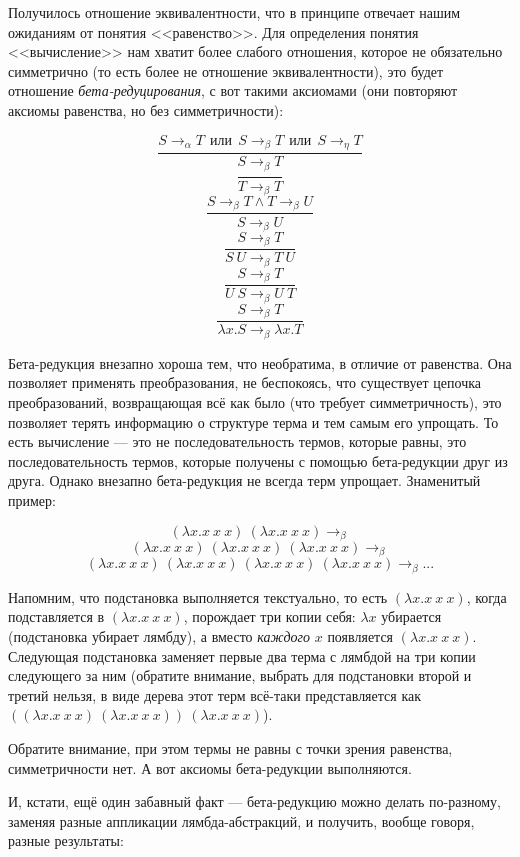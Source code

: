 \documentclass{../../text-style}
\begin{document}
Получилось отношение эквивалентности, что в принципе отвечает нашим ожиданиям от понятия <<равенство>>. Для определения понятия <<вычисление>> нам хватит более слабого отношения, которое не обязательно симметрично (то есть более не отношение эквивалентности), это будет отношение \textit{бета-редуцирования}, с вот такими аксиомами (они повторяют аксиомы равенства, но без симметричности):

$$\dfrac{S \rightarrow_\alpha T\ \ 
\mbox{или}\ \ S \rightarrow_\beta T\ \ 
\mbox{или}\ \  S \rightarrow_\eta T}{S \rightarrow_\beta T}$$ 
$$\dfrac{}{T \rightarrow_\beta T}$$
$$\dfrac{S \rightarrow_\beta T \wedge T \rightarrow_\beta U}{S \rightarrow_\beta U}$$
$$\dfrac{S \rightarrow_\beta T}{S\ U \rightarrow_\beta T\ U}$$
$$\dfrac{S \rightarrow_\beta T}{U\ S \rightarrow_\beta U\ T}$$
$$\dfrac{S \rightarrow_\beta T}{\lambda x.S \rightarrow_\beta \lambda x.T}$$

Бета-редукция внезапно хороша тем, что необратима, в отличие от равенства. Она позволяет применять преобразования, не беспокоясь, что существует цепочка преобразований, возвращающая всё как было (что требует симметричность), это позволяет терять информацию о структуре терма и тем самым его упрощать. То есть вычисление --- это не последовательность термов, которые равны, это последовательность термов, которые получены с помощью бета-редукции друг из друга. Однако внезапно бета-редукция не всегда терм упрощает. Знаменитый пример:

$$(\lambda x.x\ x\ x)\ (\lambda x.x\ x\ x) \rightarrow_\beta$$ 
$$(\lambda x.x\ x\ x)\ (\lambda x.x\ x\ x)\ (\lambda x.x\ x\ x) \rightarrow_\beta$$
$$(\lambda x.x\ x\ x)\ (\lambda x.x\ x\ x)\ (\lambda x.x\ x\ x)\ (\lambda x.x\ x\ x) \rightarrow_\beta ...$$

Напомним, что подстановка выполняется текстуально, то есть $(\lambda x.x\ x\ x)$, когда подставляется в $(\lambda x.x\ x\ x)$, порождает три копии себя:  $\lambda x$ убирается (подстановка убирает лямбду), а вместо \textit{каждого} $x$ появляется $(\lambda x.x\ x\ x)$. Следующая подстановка заменяет первые два терма с лямбдой на три копии следующего за ним (обратите внимание, выбрать для подстановки второй и третий нельзя, в виде дерева этот терм всё-таки представляется как $((\lambda x.x\ x\ x)\ (\lambda x.x\ x\ x))\ (\lambda x.x\ x\ x)$).

Обратите внимание, при этом термы не равны с точки зрения равенства, симметричности нет. А вот аксиомы бета-редукции выполняются. 

И, кстати, ещё один забавный факт --- бета-редукцию можно делать по-разному, заменяя разные аппликации лямбда-абстракций, и получить, вообще говоря, разные результаты:
\end{document}
